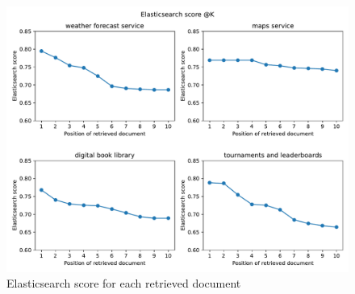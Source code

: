 \begin{figure}[!h]
    \begin{center}
        \includegraphics[width=0.8\linewidth]{assets/pdf/evaluation/es-scores}
    \end{center}

    \caption{Elasticsearch score for each retrieved document}
    \label{fig:es-scores}
\end{figure}
